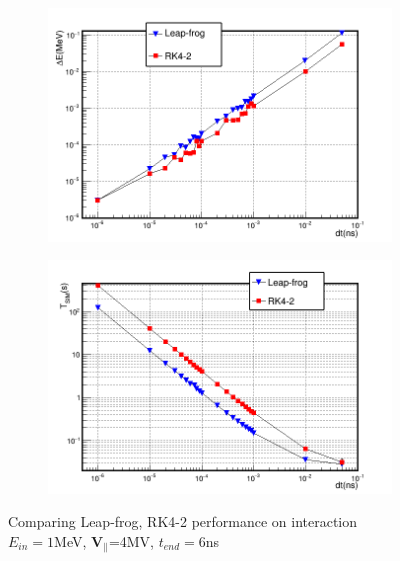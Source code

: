 \documentclass[a4paper,oneside,12pt]{report}
\numberwithin{equation}{chapter}
\begin{document}
\begin{figure}[H]
    \captionsetup[subfigure]{justification=centering}
    \captionsetup{justification=centering}
    \centering
    \begin{subfigure}{0.9\textwidth}
        \centering
        \includegraphics[width=\linewidth]{./figures/analiz/staticE_lf_rk2_dt-E.png}
    \end{subfigure}
    
    \begin{subfigure}{0.9\textwidth}
        \centering
        \includegraphics[width=\linewidth]{./figures/analiz/staticE_lf_rk2_dt-Tsim.png}
    \end{subfigure}
    \caption{Comparing Leap-frog, RK4-2 performance on \eE interaction\\ $E_{in}=1$MeV, $\textbf{V}_{\parallel}$=4MV, $t_{end}=6$ns}
    \label{fig:lf_rk2_par_stat_E_comparison}
\end{figure}
\end{document}
